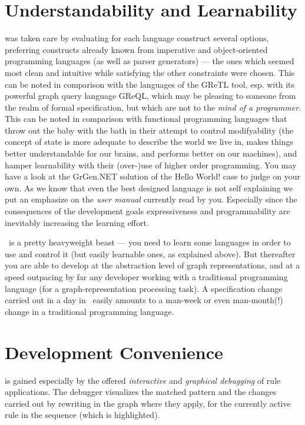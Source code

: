 \section{Understandability and Learnability}
was taken care by evaluating for each language construct several options,
preferring constructs already known from imperative and object-oriented programming languages (as well as parser generators) ---
the ones which seemed most clean and intuitive while satisfying the other constraints were chosen.
This can be noted in comparison with the languages of the GReTL \cite{GReTL} tool, esp. with its powerful graph query language GReQL,
which may be pleasing to someone from the realm of formal specification, but which are not to the \emph{mind of a programmer}.
This can be noted in comparison with functional programming languages that throw out the baby with the bath in their attempt to control modifyability (the concept of state is more adequate to describe the world we live in, makes things better understandable for our brains, and performs better on our machines), and hamper learnability with their (over-)use of higher order programming.
You may have a look at the GrGen.NET solution of the Hello World! case \cite{HelloWorld} to judge on your own.
As we know that even the best designed language is not self explaining we put an emphasize on the \emph{user manual} currently read by you.
Especially since the consequences of the development goals expressiveness and programmability are inevitably increasing the learning effort.

\GrG\ is a pretty heavyweight beast --- you need to learn some languages in order to use and control it (but easily learnable ones, as explained above).
But thereafter you are able to develop at the abstraction level of graph representations, and at a speed outpacing by far any developer working with a traditional programming language (for a graph-representation processing task).
A specification change carried out in a day in \GrG\ easily amounts to a man-week or even man-month(!) change in a traditional programming language.

\section{Development Convenience}
is gained especially by the offered \emph{interactive} and \emph{graphical debugging} of rule applications.
The debugger visualizes the matched pattern and the changes carried out by rewriting in the graph where they apply,
for the currently active rule in the sequence (which is highlighted).

